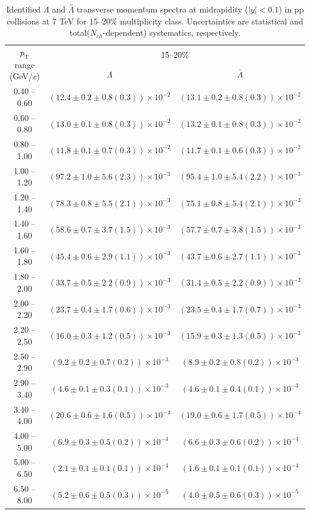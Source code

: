 \begin{table}
\caption{Identified $\Lambda$ and $\bar{\Lambda}$  transverse momentum spectra at midrapidity ($|y|<0.1$) in pp collisions at 7 TeV for 15--20\% multiplicity class. Uncertainties are statistical and total($N_{ch}$-dependent) systematics, respectively.}
\label{tab:Lambda_AntiLambda_15to20}
\begin{center}
\begin{tabular}{ c | c c }
\hline
\multirow{2}{*}{$p_{\mathrm{T}}$ range (GeV/\textit{c})} & \multicolumn{2}{c}{15--20\%} \\ & $\Lambda$& $\bar{\Lambda}$\\ 
\hline
0.40 -- 0.60 & $(12.4\pm0.2\pm0.8(0.3))\times10^{-2}$ & $(13.1\pm0.2\pm0.8(0.3))\times10^{-2}$ \\ 
0.60 -- 0.80 & $(13.0\pm0.1\pm0.8(0.3))\times10^{-2}$ & $(13.2\pm0.1\pm0.8(0.3))\times10^{-2}$ \\ 
0.80 -- 1.00 & $(11.8\pm0.1\pm0.7(0.3))\times10^{-2}$ & $(11.7\pm0.1\pm0.6(0.3))\times10^{-2}$ \\ 
1.00 -- 1.20 & $(97.2\pm1.0\pm5.6(2.3))\times10^{-3}$ & $(95.4\pm1.0\pm5.4(2.2))\times10^{-3}$ \\ 
1.20 -- 1.40 & $(78.3\pm0.8\pm5.5(2.1))\times10^{-3}$ & $(75.1\pm0.8\pm5.4(2.1))\times10^{-3}$ \\ 
1.40 -- 1.60 & $(58.6\pm0.7\pm3.7(1.5))\times10^{-3}$ & $(57.7\pm0.7\pm3.8(1.5))\times10^{-3}$ \\ 
1.60 -- 1.80 & $(45.4\pm0.6\pm2.9(1.1))\times10^{-3}$ & $(43.7\pm0.6\pm2.7(1.1))\times10^{-3}$ \\ 
1.80 -- 2.00 & $(33.7\pm0.5\pm2.2(0.9))\times10^{-3}$ & $(31.4\pm0.5\pm2.2(0.9))\times10^{-3}$ \\ 
2.00 -- 2.20 & $(23.7\pm0.4\pm1.7(0.6))\times10^{-3}$ & $(23.5\pm0.4\pm1.7(0.7))\times10^{-3}$ \\ 
2.20 -- 2.50 & $(16.0\pm0.3\pm1.2(0.5))\times10^{-3}$ & $(15.9\pm0.3\pm1.3(0.5))\times10^{-3}$ \\ 
2.50 -- 2.90 & $(9.2\pm0.2\pm0.7(0.2))\times10^{-3}$ & $(8.9\pm0.2\pm0.8(0.2))\times10^{-3}$ \\ 
2.90 -- 3.40 & $(4.6\pm0.1\pm0.3(0.1))\times10^{-3}$ & $(4.6\pm0.1\pm0.4(0.1))\times10^{-3}$ \\ 
3.40 -- 4.00 & $(20.6\pm0.6\pm1.6(0.5))\times10^{-4}$ & $(19.0\pm0.6\pm1.7(0.5))\times10^{-4}$ \\ 
4.00 -- 5.00 & $(6.9\pm0.3\pm0.5(0.2))\times10^{-4}$ & $(6.6\pm0.3\pm0.6(0.2))\times10^{-4}$ \\ 
5.00 -- 6.50 & $(2.1\pm0.1\pm0.1(0.1))\times10^{-4}$ & $(1.6\pm0.1\pm0.1(0.1))\times10^{-4}$ \\ 
6.50 -- 8.00 & $(5.2\pm0.6\pm0.5(0.3))\times10^{-5}$ & $(4.0\pm0.5\pm0.6(0.3))\times10^{-5}$ \\ 
\hline
\end{tabular}
\end{center}
\end{table}
 
